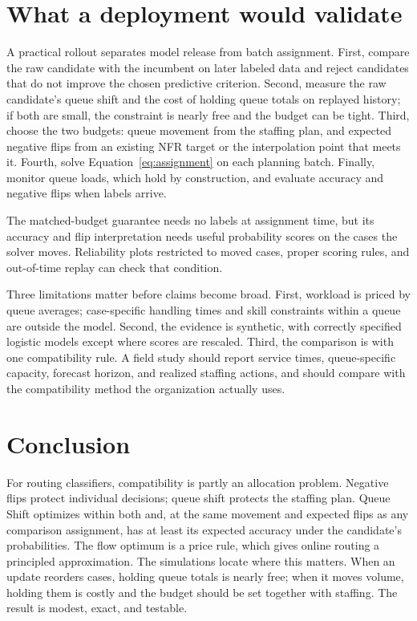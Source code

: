 \documentclass[11pt]{article}
\begin{document}


\section{What a deployment would validate}

A practical rollout separates model release from batch assignment. First, compare the raw
candidate with the incumbent on later labeled data and reject candidates that do not improve the
chosen predictive criterion. Second, measure the raw candidate's queue shift and the cost of
holding queue totals on replayed history; if both are small, the constraint is nearly free and
the budget can be tight. Third, choose the two budgets: queue movement from the staffing plan, and
expected negative flips from an existing NFR target or the interpolation point that meets it.
Fourth, solve Equation~\ref{eq:assignment} on each planning batch. Finally, monitor queue loads,
which hold by construction, and evaluate accuracy and negative flips when labels arrive.

The matched-budget guarantee needs no labels at assignment time, but its accuracy and flip
interpretation needs useful probability scores on the cases the solver moves. Reliability plots
restricted to moved cases, proper scoring rules, and out-of-time replay can check that condition.

Three limitations matter before claims become broad. First, workload is priced by queue averages;
case-specific handling times and skill constraints within a queue are outside the model. Second, the
evidence is synthetic, with correctly specified logistic models except where scores are rescaled.
Third, the comparison is with one compatibility rule. A field study should report service times,
queue-specific capacity, forecast horizon, and realized staffing actions, and should compare with
the compatibility method the organization actually uses.

\section{Conclusion}

For routing classifiers, compatibility is partly an allocation problem. Negative flips protect
individual decisions; queue shift protects the staffing plan. Queue Shift optimizes within both
and, at the same movement and expected flips as any comparison assignment, has at least its
expected accuracy under the candidate's probabilities. The flow optimum is a price rule, which
gives online routing a principled approximation. The simulations locate where this matters. When
an update reorders cases, holding queue totals is nearly free; when it moves volume, holding them
is costly and the budget should be set together with staffing. The result is modest, exact, and
testable.
\end{document}
